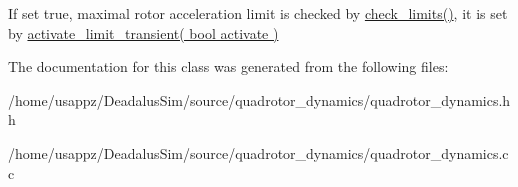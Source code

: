 \-If set true, maximal rotor acceleration limit is checked by \hyperlink{classQuadRotorDynamics_a8c92658749a4850ff5926d580e418e7c}{check\-\_\-limits()}, it is set by \hyperlink{classQuadRotorDynamics_ac4f8ac41406b65281bdc5956af41add5}{activate\-\_\-limit\-\_\-transient( bool activate )} 

\-The documentation for this class was generated from the following files\-:\begin{DoxyCompactItemize}
\item 
/home/usappz/\-Deadalus\-Sim/source/quadrotor\-\_\-dynamics/quadrotor\-\_\-dynamics.\-hh\item 
/home/usappz/\-Deadalus\-Sim/source/quadrotor\-\_\-dynamics/quadrotor\-\_\-dynamics.\-cc\end{DoxyCompactItemize}
